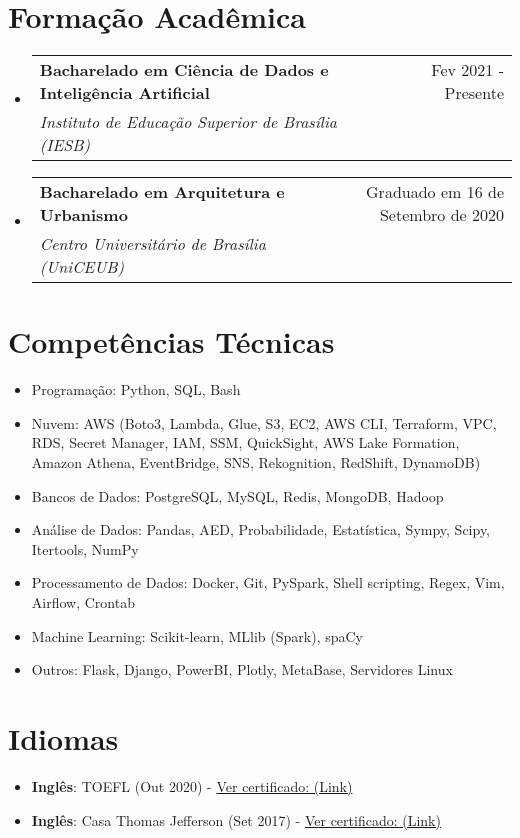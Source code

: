 \documentclass[letterpaper,11pt]{article}%
\makeatletter
\newcommand{\resumeSubheading}[4]{\vspace{-1pt}\item\begin{tabular*}{0.97\textwidth}[t]{l@{\extracolsep{\fill}}r}\textbf{#1} & #2 \\\textit{\small #3} & \textit{\small #4} \\\end{tabular*}\vspace{-8pt}}%
\newcommand{\resumeSubHeadingListStart}{\begin{itemize}[leftmargin=0.15in, label={}, itemsep=0pt, parsep=0pt]}%
\newcommand{\resumeSubHeadingListEnd}{\end{itemize}}%
\newcommand{\resumeItemListStart}{\begin{itemize}[itemsep=0pt, parsep=0pt]}%
\newcommand{\resumeItemListEnd}{\end{itemize}\vspace{-1pt}}%
\makeatother
\begin{document}
%
\section*{Formação Acadêmica}%
\label{sec:FormaoAcadmica}%
\resumeSubHeadingListStart%
\resumeSubheading{Bacharelado em Ciência de Dados e Inteligência Artificial}{Fev 2021 - Presente}{Instituto de Educação Superior de Brasília (IESB)}{}%
\resumeSubHeadingListEnd%
\resumeSubHeadingListStart%
\resumeSubheading{Bacharelado em Arquitetura e Urbanismo}{Graduado em 16 de Setembro de 2020}{Centro Universitário de Brasília (UniCEUB)}{}%
\resumeSubHeadingListEnd

%
\section*{Competências Técnicas}%
\label{sec:CompetnciasTcnicas}%
\begin{multicols}{2}%
\resumeItemListStart%
\item Programação: Python, SQL, Bash%
\item Nuvem: AWS (Boto3, Lambda, Glue, S3, EC2, AWS CLI, Terraform, VPC, RDS, Secret Manager, IAM, SSM, QuickSight, AWS Lake Formation, Amazon Athena, EventBridge, SNS, Rekognition, RedShift, DynamoDB)%
\item Bancos de Dados: PostgreSQL, MySQL, Redis, MongoDB, Hadoop%
\item Análise de Dados: Pandas, AED, Probabilidade, Estatística, Sympy, Scipy, Itertools, NumPy%
\item Processamento de Dados: Docker, Git, PySpark, Shell scripting, Regex, Vim, Airflow, Crontab%
\item Machine Learning: Scikit-learn, MLlib (Spark), spaCy%
\item Outros: Flask, Django, PowerBI, Plotly, MetaBase, Servidores Linux%
\resumeItemListEnd%
\end{multicols}

%
\section*{Idiomas}%
\label{sec:Idiomas}%
\begin{itemize}[leftmargin=0.15in, label={}]%
\item%
\textbf{Inglês}: TOEFL (Out 2020) - \href{https://github.com/s33ding/my_resume/blob/main/my_certificates/english_TOEFL_my_score.pdf}{Ver certificado: (Link)}%
\item%
\textbf{Inglês}: Casa Thomas Jefferson (Set 2017) - \href{https://github.com/s33ding/my_resume/blob/main/my_certificates/english_Casa%20Thomas%20Jefferson.pdf}{Ver certificado: (Link)}%
\end{itemize}

%
\end{document}
